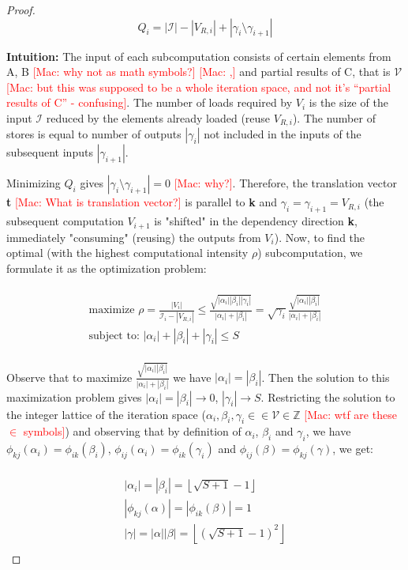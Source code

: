 \documentclass[sigplan,review,anonymous]{acmart}\settopmatter{printfolios=true,printccs=false,printacmref=false}
\newcommand\mac[1]{\textcolor{red}{[Mac: #1]}}
\begin{document}
\begin{proof}
$$Q_i = |\mathcal{I}| - |V_{R,i}| + |\gamma_i \setminus \gamma_{i+1}|$$

\textbf{Intuition:} The input of each subcomputation consists of certain
elements from A, B \mac{why not as math symbols?} \mac{,} and partial results
of C, that is $\mathcal{V}$ \mac{but this was supposed to be a whole iteration
space, and not it's ``partial results of C'' - confusing}. The number of loads
required by $V_i$ is the size of the input $\mathcal{I}$ reduced by the
elements already loaded (reuse $V_{R,i}$). The number of stores is equal to
number of outputs $|\gamma_i|$ not included in the inputs of the subsequent
inputs $|\gamma_{i+1}|$.

Minimizing $Q_i$ gives $|\gamma_i \setminus \gamma_{i+1}| = 0$ \mac{why?}.
Therefore, the translation vector \textbf{t} \mac{What is translation vector?}
is parallel to \textbf{k} and $\gamma_i = \gamma_{i+1} = V_{R,i}$ (the
subsequent computation $V_{i+1}$ is "shifted" in the dependency direction
\textbf{k}, immediately "consuming" (reusing) the outputs from $V_i$). Now, to
find the optimal (with the highest computational intensity $\rho$)
subcomputation, we formulate it as the optimization problem:

\begin{multline}
\\
\text{maximize } \rho = \frac{|V_i|}{\mathcal{I}_i - |V_{R,i}|} \le 
\frac{\sqrt{|\alpha_i| |\beta_i| |\gamma_i|}}{|\alpha_i| + |\beta_i|} = 
\sqrt{\gamma_i}\frac{\sqrt{|\alpha_i| |\beta_i|}}{|\alpha_i| + |\beta_i|}\\
\text{subject to: } |\alpha_i| + |\beta_i| + |\gamma_i| \le S \\
\end{multline}

Observe that to maximize $\frac{\sqrt{|\alpha_i| |\beta_i|}}{|\alpha_i| +
|\beta_i|}$ we have $|\alpha_i| = |\beta_i|$. Then the solution to this
maximization problem gives  $|\alpha_i| = |\beta_i| \rightarrow 0$, $|\gamma_i|
\rightarrow S$.  Restricting the solution to the integer lattice of the
iteration space ($\alpha_i, \beta_i, \gamma_i \in \in \mathcal{V} \in
\mathbb{Z}$ \mac{wtf are these $\in$ symbols}) and observing that by definition
of $\alpha_i$, $\beta_i$ and $\gamma_i$, we have $\phi_{kj}(\alpha_i) =
\phi_{ik}(\beta_i)$, $\phi_{ij}(\alpha_i) = \phi_{ik}(\gamma_i)$ and
$\phi_{ij}(\beta) = \phi_{kj}(\gamma)$, we get:

\begin{multline}
\label{eq:seqSolution}
\\
|\alpha_i| = |\beta_i|= \left \lfloor{\sqrt{S + 1} - 1} \right \rfloor \\
|\phi_{kj}(\alpha)| = |\phi_{ik}(\beta)| = 1 \\
|\gamma| = |\alpha| |\beta| = \left \lfloor{(\sqrt{S + 1} - 1)^2} \right 
\rfloor 
\\
\end{multline}
 


\end{proof}
\end{document}
